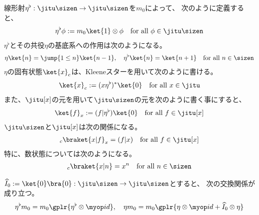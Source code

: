 {	線形射$\eta^\flat:\jitu\sizen\to\jitu\sizen$を$m_0$によって、
	次のように定義すると、
	\begin{equation*}\begin{split}
		\eta^\flat\phi := m_0\ket{1}\otimes\phi
		\quad\text{for all } \phi\in\jitu\sizen
	\end{split}\end{equation*}
	$\eta^\flat$とその共役$\eta$の基底系への作用は次のようになる。
	\begin{equation*}\begin{split}
		\eta\ket{n} = \jump{1\le n}\ket{n-1},\quad
		\eta^\flat\ket{n} = \ket{n+1} \quad\text{for all } n\in\sizen
	\end{split}\end{equation*}
	$\eta$の固有状態$\ket{x}_c$は、Kleeneスターを用いて次のように書ける。
	\begin{equation*}\begin{split}
		\ket{x}_c := (x\eta^\flat)^*\ket{0} \quad\text{for all } x\in\jitu
	\end{split}\end{equation*}
	また、$\jitu[x]$の元を用いて$\jitu\sizen$の元を次のように書く事にすると、
	\begin{equation*}\begin{split}
		\ket{f}_x := (f|\eta^\flat)\ket{0}
		\quad\text{for all } f\in\jitu[x]
	\end{split}\end{equation*}
	$\jitu\sizen$と$\jitu[x]$は次の関係になる。
	\begin{equation*}\begin{split}
		{}_c\braket{x|f}_x = (f|x) \quad\text{for all } f\in\jitu[x]
	\end{split}\end{equation*}
	特に、数状態については次のようになる。
	\begin{equation*}\begin{split}
		{}_c\braket{x|n} = x^n \quad\text{for all } n\in\sizen
	\end{split}\end{equation*}

	$\Ihat_0:=\ket{0}\bra{0}:\jitu\sizen\to\jitu\sizen$とすると、
	次の交換関係が成り立つ。
	\begin{equation*}\begin{split}
		\eta^\flat m_0 = m_0\gplr{\eta^\flat\otimes\id},\quad
		\eta m_0 = m_0\gplr{\eta\otimes\id + \Ihat_0\otimes\eta}
	\end{split}\end{equation*}

}
